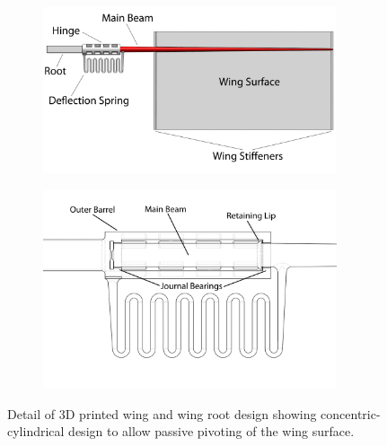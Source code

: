 \documentclass[fleqn,10pt]{wlscirep}
\begin{document}
\begin{figure}[h]%
\centering
\begin{subfigure}[t]{0.45\textwidth}
    \centering
    \includegraphics[width=0.95\textwidth]{figures/wing1}
    \caption{\label{fig:wing1}}
\end{subfigure}
\begin{subfigure}[t]{0.45\textwidth}
    \centering
    \includegraphics[trim=0 105 0 0, clip, width=0.95\textwidth]{figures/root2}
    \caption{\label{fig:root2}}
\end{subfigure}
\caption{Detail of 3D printed wing  and wing root  design
  showing concentric-cylindrical design to allow passive pivoting of the wing surface.}
\end{figure}
\end{document}
